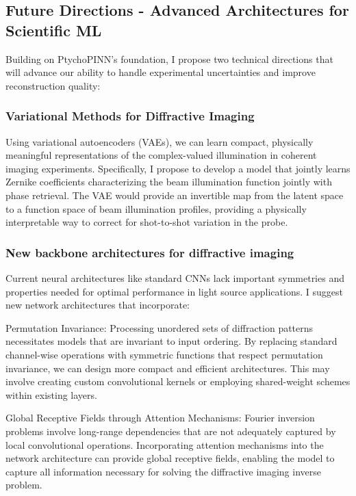\documentclass{article}
\begin{document}
\subsection{Future Directions - Advanced Architectures for Scientific ML}
Building on PtychoPINN's foundation, I propose two technical directions that will advance our ability to handle experimental uncertainties and improve reconstruction quality:

\subsubsection{Variational Methods for Diffractive Imaging}
Using variational autoencoders (VAEs), we can learn compact, physically meaningful representations of the complex-valued illumination in coherent imaging experiments. Specifically, I propose to develop a model that jointly learns Zernike coefficients characterizing the beam illumination function jointly with phase retrieval. The VAE would provide an invertible map from the latent space to a function space of beam illumination profiles, providing a physically interpretable way to correct for shot-to-shot variation in the probe.

\subsubsection{New backbone architectures for diffractive imaging}
Current neural architectures like standard CNNs lack important symmetries and properties needed for optimal performance in light source applications. I suggest new network architectures that incorporate:

Permutation Invariance: Processing unordered sets of diffraction patterns necessitates models that are invariant to input ordering. By replacing standard channel-wise operations with symmetric functions that respect permutation invariance, we can design more compact and efficient architectures. This may involve creating custom convolutional kernels or employing shared-weight schemes within existing layers.

Global Receptive Fields through Attention Mechanisms: Fourier inversion problems involve long-range dependencies that are not adequately captured by local convolutional operations. Incorporating attention mechanisms into the network architecture can provide global receptive fields, enabling the model to capture all information necessary for solving the diffractive imaging inverse problem.
\end{document}
